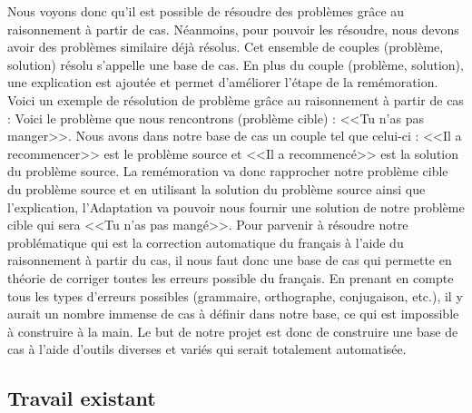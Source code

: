 \documentclass{article}
\begin{document}
Nous voyons donc qu'il est possible de r\'{e}soudre des probl\`{e}mes gr\^ace au raisonnement \`{a} partir de cas. N\'{e}anmoins, pour pouvoir les r\'{e}soudre, nous devons avoir des probl\`{e}mes similaire d\'{e}j\`{a} r\'{e}solus. Cet ensemble de couples (probl\`{e}me, solution) r\'{e}solu s'appelle une base de cas. En plus du couple (probl\`{e}me, solution), une explication est ajout\'{e}e et permet d'am\'{e}liorer l'\'{e}tape de la rem\'{e}moration.
\newline
\newline
Voici un exemple de r\'{e}solution de probl\`{e}me gr\^ace au raisonnement \`{a} partir de cas : 
Voici le probl\`{e}me que nous rencontrons (probl\`{e}me cible) : <<Tu n'as pas manger>>.
Nous avons dans notre base de cas un couple tel que celui-ci : <<Il a recommencer>> est le probl\`{e}me source et <<Il a recommenc\'{e}>> est la solution du probl\`{e}me source.
La rem\'{e}moration va donc rapprocher notre probl\`{e}me cible du probl\`{e}me source et en utilisant la solution du probl\`{e}me source ainsi que l'explication, l'Adaptation va pouvoir nous fournir une solution de notre probl\`{e}me cible qui sera <<Tu n'as pas mang\'{e}>>.
\newline
\newline
Pour parvenir \`{a} r\'{e}soudre notre probl\'{e}matique qui est la correction automatique du français \`{a} l'aide du raisonnement \`{a} partir du cas, il nous faut donc une base de cas qui permette en th\'{e}orie de corriger toutes les erreurs possible du français. En prenant en compte tous les types d'erreurs possibles (grammaire, orthographe, conjugaison, etc.), il y aurait un nombre immense de cas \`{a} d\'{e}finir dans notre base, ce qui est impossible \`{a} construire \`{a} la main. Le but de notre projet est donc de construire une base de cas \`{a} l'aide d'outils diverses et vari\'{e}s qui serait totalement automatis\'{e}e.

\cleardoublepage

\subsection{Travail existant}
\end{document}
